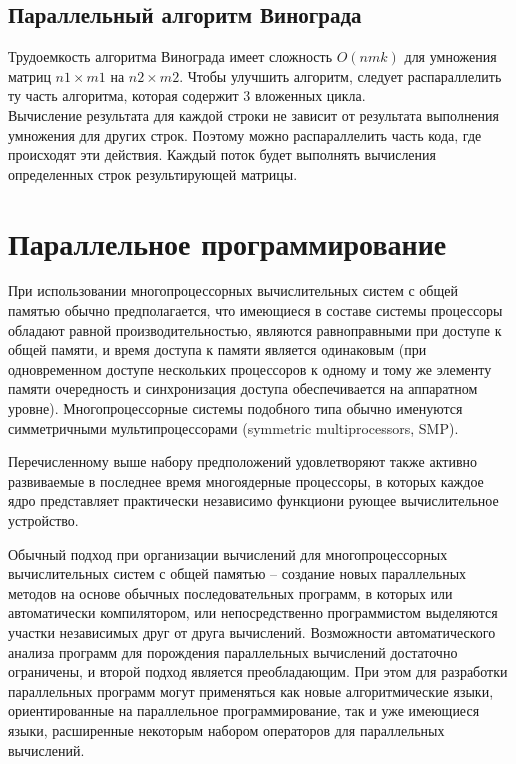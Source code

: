 \documentclass[12pt]{report}
\begin{document}
\subsection{Параллельный алгоритм Винограда}
Трудоемкость алгоритма Винограда имеет сложность $O(nmk)$ для умножения матриц $n1 \times m1$ на $n2 \times m2$. Чтобы улучшить алгоритм, следует распараллелить ту часть алгоритма, которая содержит 3 вложенных цикла.\\

Вычисление результата для каждой строки не зависит от результата выполнения умножения для других строк. Поэтому можно распараллелить часть кода, где происходят эти действия. Каждый поток будет выполнять вычисления определенных строк результирующей матрицы.

\section{Параллельное программирование}

При использовании многопроцессорных вычислительных систем с общей памятью обычно предполагается, что имеющиеся в составе системы процессоры обладают равной производительностью, являются равноправными при доступе к общей памяти, и время доступа к памяти является одинаковым (при одновременном доступе нескольких процессоров к одному и тому же элементу памяти очередность и синхронизация доступа обеспечивается на аппаратном уровне). Многопроцессорные системы подобного типа обычно именуются симметричными мультипроцессорами (symmetric multiprocessors, SMP).

Перечисленному выше набору предположений удовлетворяют также активно развиваемые в последнее время многоядерные процессоры, в которых каждое ядро представляет практически независимо функциони рующее вычислительное устройство.

Обычный подход при организации вычислений для многопроцессорных вычислительных систем с общей памятью – создание новых параллельных методов на основе обычных последовательных программ, в которых или автоматически компилятором, или непосредственно программистом выделяются участки независимых друг от друга вычислений. Возможности автоматического анализа программ для порождения параллельных вычислений достаточно ограничены, и второй подход является преобладающим. При этом для разработки параллельных программ могут применяться как новые алгоритмические языки, ориентированные на параллельное программирование, так и уже имеющиеся языки, расширенные некоторым набором операторов для параллельных вычислений.
\end{document}
